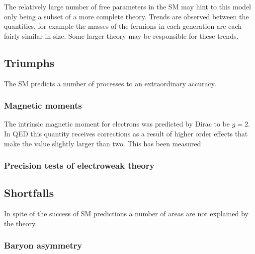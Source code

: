 The relatively large number of free parameters in the SM may hint to this model only being a subset of a more complete theory. Trends are observed between the quantities, for example the masses of the fermions in each generation are each fairly similar in size. Some larger theory may be responsible for these trends.  

\subsection{Triumphs}
The SM predicts a number of processes to an extraordinary accuracy. 
\subsubsection{Magnetic moments}
The intrinsic magnetic moment for electrons was predicted by Dirac to be $g=2$. In QED this quantity receives corrections as a result of higher order effects that make the value slightly larger than two. This has been measured

\subsubsection{Precision tests of electroweak theory}





\subsection{Shortfalls}
In spite of the success of SM predictions a number of areas are not explained by the theory.  

\subsubsection{Baryon asymmetry} 


